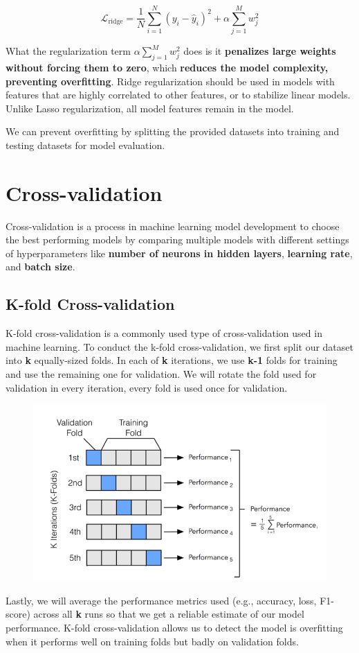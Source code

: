 \documentclass[12pt]{article}
\begin{document}
\[
\mathcal{L}_{\text{ridge}} = \frac{1}{N} \sum_{i=1}^{N} (y_i - \hat{y}_i)^2 + \alpha \sum_{j=1}^{M} w_j^2
\]
\vspace{1.0em}

What the regularization term $\alpha \sum_{j=1}^{M} w_j^2$ does is it \textbf{penalizes large weights without forcing them to zero}, which \textbf{reduces the model complexity, preventing overfitting}. Ridge regularization should be used in models with features that are highly correlated to other features, or to stabilize linear models. Unlike Lasso regularization, all model features remain in the model.
\vspace{1.5em}

We can prevent overfitting by splitting the provided datasets into training and testing datasets for model evaluation.

\newpage
\section{Cross-validation}
Cross-validation is a process in machine learning model development to choose the best performing models by comparing multiple models with different settings of hyperparameters like \textbf{number of neurons in hidden layers}, \textbf{learning rate}, and \textbf{batch size}.

\subsection{K-fold Cross-validation}
K-fold cross-validation is a commonly used type of cross-validation used in machine learning. To conduct the k-fold cross-validation, we first split our dataset into \textbf{k} equally-sized folds. In each of \textbf{k} iterations, we use \textbf{k-1} folds for training and use the remaining one for validation. We will rotate the fold used for validation in every iteration, every fold is used once for validation.

\begin{figure}[h]
\centering
  \includegraphics[width=0.60\linewidth]{images/lecture_04/img_10.png}
  \caption{\cite{crossValidationImage}}
  \label{fig:img_10}
\end{figure}

Lastly, we will average the performance metrics used (e.g., accuracy, loss, F1-score) across all \textbf{k} runs so that we get a reliable estimate of our model performance. K-fold cross-validation allows us to detect the model is overfitting when it performs well on training folds but badly on validation folds. 



\end{document}
